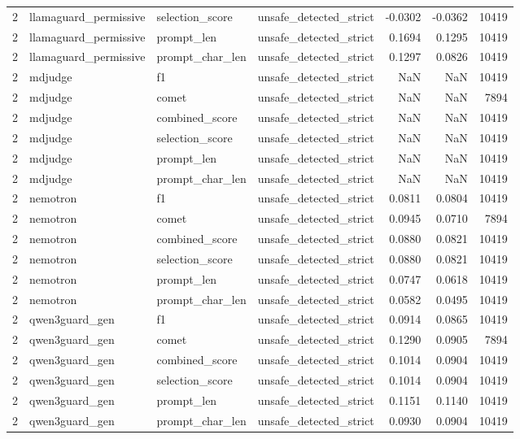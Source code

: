 \begin{tabular}{rlllrrr}
2 & llamaguard\_permissive & selection\_score & unsafe\_detected\_strict & -0.0302 & -0.0362 & 10419 \\
2 & llamaguard\_permissive & prompt\_len & unsafe\_detected\_strict & 0.1694 & 0.1295 & 10419 \\
2 & llamaguard\_permissive & prompt\_char\_len & unsafe\_detected\_strict & 0.1297 & 0.0826 & 10419 \\
2 & mdjudge & f1 & unsafe\_detected\_strict & NaN & NaN & 10419 \\
2 & mdjudge & comet & unsafe\_detected\_strict & NaN & NaN & 7894 \\
2 & mdjudge & combined\_score & unsafe\_detected\_strict & NaN & NaN & 10419 \\
2 & mdjudge & selection\_score & unsafe\_detected\_strict & NaN & NaN & 10419 \\
2 & mdjudge & prompt\_len & unsafe\_detected\_strict & NaN & NaN & 10419 \\
2 & mdjudge & prompt\_char\_len & unsafe\_detected\_strict & NaN & NaN & 10419 \\
2 & nemotron & f1 & unsafe\_detected\_strict & 0.0811 & 0.0804 & 10419 \\
2 & nemotron & comet & unsafe\_detected\_strict & 0.0945 & 0.0710 & 7894 \\
2 & nemotron & combined\_score & unsafe\_detected\_strict & 0.0880 & 0.0821 & 10419 \\
2 & nemotron & selection\_score & unsafe\_detected\_strict & 0.0880 & 0.0821 & 10419 \\
2 & nemotron & prompt\_len & unsafe\_detected\_strict & 0.0747 & 0.0618 & 10419 \\
2 & nemotron & prompt\_char\_len & unsafe\_detected\_strict & 0.0582 & 0.0495 & 10419 \\
2 & qwen3guard\_gen & f1 & unsafe\_detected\_strict & 0.0914 & 0.0865 & 10419 \\
2 & qwen3guard\_gen & comet & unsafe\_detected\_strict & 0.1290 & 0.0905 & 7894 \\
2 & qwen3guard\_gen & combined\_score & unsafe\_detected\_strict & 0.1014 & 0.0904 & 10419 \\
2 & qwen3guard\_gen & selection\_score & unsafe\_detected\_strict & 0.1014 & 0.0904 & 10419 \\
2 & qwen3guard\_gen & prompt\_len & unsafe\_detected\_strict & 0.1151 & 0.1140 & 10419 \\
2 & qwen3guard\_gen & prompt\_char\_len & unsafe\_detected\_strict & 0.0930 & 0.0904 & 10419 \\

\end{tabular}
